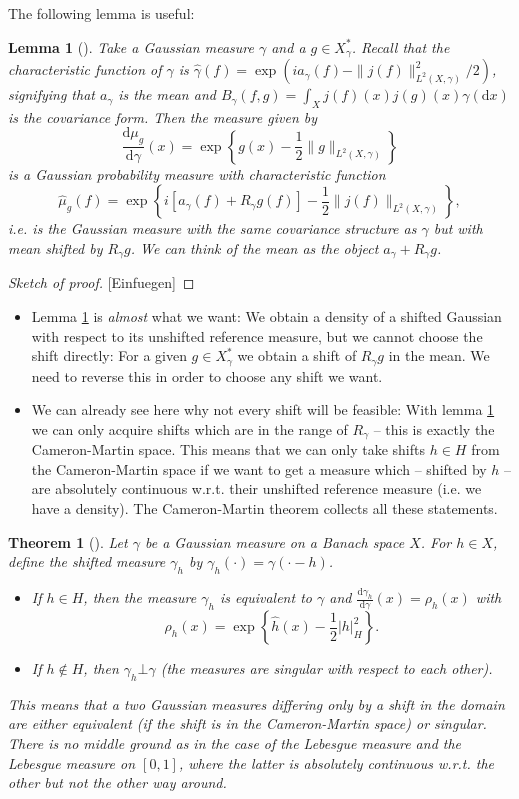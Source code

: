\documentclass{scrartcl}
\newtheorem{lemma}{Lemma}
\newtheorem{theorem}{Theorem}
\theoremstyle{definition}
\theoremstyle{remark}
\newcommand{\de}{\mathrm d}
\newcommand{\ednote}[1]{{\color{red}[#1]}}
\begin{document}
The following lemma is useful:
\begin{lemma}[{\cite[Lemma 3.1.4]{Lunardi}}]\label{lem:prelim_CM}
Take a Gaussian measure $\gamma$ and a $g\in X_\gamma^*$. Recall that the characteristic function of $\gamma$ is $\hat \gamma(f) = \exp(ia_\gamma(f) - \|j(f)\|_{L^2(X, \gamma)}^2/2)$, signifying that $a_\gamma$ is the mean and $B_\gamma(f, g) = \int_X j(f)(x)j(g)(x)\gamma(\de x)$ is the covariance form. Then the measure given by
\[\frac{\de\mu_g}{\de \gamma}(x) = \exp\left\{g(x)-\frac{1}{2}\|g\|_{L^2(X,\gamma)}\right\}\]
is a Gaussian probability measure with characteristic function
\[\hat\mu_g(f) = \exp\left\{i[a_\gamma(f) + R_\gamma g(f)]-\frac{1}{2}\|j(f)\|_{L^2(X,\gamma)}\right\},\]
i.e. is the Gaussian measure with the same covariance structure as $\gamma$ but with mean shifted by $R_\gamma g$. We can think of the mean as the object $a_\gamma + R_\gamma g$.
\end{lemma}
\begin{proof}[Sketch of proof]
\ednote{Einfuegen}
\end{proof}
\begin{itemize}
\item Lemma \ref{lem:prelim_CM} is \textit{almost} what we want: We obtain a density of a shifted Gaussian with respect to its unshifted reference measure, but we cannot choose the shift directly: For a given $g\in X_\gamma^*$ we obtain a shift of $R_\gamma g$ in the mean. We need to reverse this in order to choose any shift we want. 
\item We can already see here why not every shift will be feasible: With lemma \ref{lem:prelim_CM} we can only acquire shifts which are in the range of $R_\gamma$ -- this is exactly the Cameron-Martin space. This means that we can only take shifts $h\in H$ from the Cameron-Martin space if we want to get a measure which -- shifted by $h$ -- are absolutely continuous w.r.t. their unshifted reference measure (i.e. we have a density). The Cameron-Martin theorem collects all these statements.
\end{itemize} 
\begin{theorem}[{\cite[Theorem 3.1.5]{Lunardi}}]
Let $\gamma$ be a Gaussian measure on a Banach space $X$. For $h\in X$, define the shifted measure $\gamma_h$ by $\gamma_h(\cdot) = \gamma(\cdot - h)$.
\begin{itemize}
\item If $h\in H$, then the measure $\gamma_h$ is equivalent to $\gamma$ and $\frac{\de \gamma_h}{\de \gamma }(x) = \rho_h(x)$ with
\[\rho_h(x) = \exp\left\{\hat h(x) - \frac{1}{2}|h|_H^2\right\}.\]
\item If $h\not\in H$, then $\gamma_h \bot \gamma$ (the measures are singular with respect to each other).
\end{itemize}
This means that a two Gaussian measures differing only by a shift in the domain are either equivalent (if the shift is in the Cameron-Martin space) or singular. There is no middle ground as in the case of the Lebesgue measure and the Lebesgue measure on $[0,1]$, where the latter is absolutely continuous w.r.t. the other but not the other way around.
\end{theorem}
\end{document}
